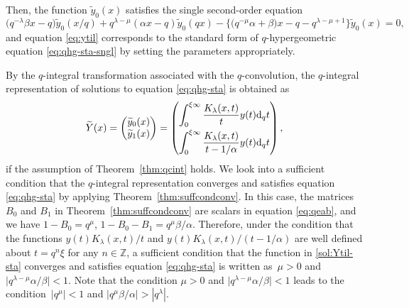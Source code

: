 \documentclass[pdftex]{sigma}
\numberwithin{equation}{section}
\theoremstyle{definition}
\begin{document}
Then, the function $\widetilde{y}_0(x)$ satisfies the single second-order equation
\begin{equation} \label{eq:ytil}
\bigl(q^{-\lambda}\beta x-q\bigr)\widetilde{y}_0(x/q) + q^{\lambda-\mu}(\alpha x-q )\widetilde{y}_0(qx) -\bigl\{ \bigl(q^{-\mu}\alpha+\beta\bigr)x- q - q^{\lambda-\mu+1}\bigr\} \widetilde{y}_0(x)=0,
\end{equation}
and equation \eqref{eq:ytil} corresponds to the standard form of $q$-hypergeometric equation \eqref{eq:qhg-sta-sngl} by setting the parameters appropriately.

By the $q$-integral transformation associated with the $q$-convolution, the $q$-integral representation of solutions to equation \eqref{eq:qhg-sta} is obtained as
\begin{equation} \label{sol:Ytil-sta}
\widetilde{Y}(x)
= \begin{pmatrix}
 \widetilde{y}_0(x) \\
 \widetilde{y}_1(x)
 \end{pmatrix}
=
\begin{pmatrix}
 \displaystyle \int_0^{\xi \infty} \frac{K_{\lambda}(x,t)}{t} y(t) {\rm d}_q t \vspace{1mm}\\
 \displaystyle \int_0^{\xi \infty} \frac{K_{\lambda}(x,t)}{t - 1/\alpha} y(t) {\rm d}_q t
\end{pmatrix} ,
\end{equation}
if the assumption of Theorem~\ref{thm:qcint} holds.
We look into a sufficient condition that the $q$-integral representation converges and satisfies equation \eqref{eq:qhg-sta} by applying Theorem~\ref{thm:suffcondconv}.
In this case, the matrices $B_0$ and $B_1$ in Theorem~\ref{thm:suffcondconv} are scalars in equation \eqref{eq:qeab}, and we have ${1 - B_0 = q^{\mu}}$, ${1 - B_0 - B_1 = q^{\mu} \beta /\alpha}$.
Therefore, under the condition that the functions $y(t) K_{\lambda}(x,t)/ t $ and ${ y(t) K_{\lambda}(x,t)/(t-1/\alpha ) }$ are well defined about $t = q^n \xi $ for any $n \in \mathbb{Z} $, a sufficient condition that the function in \eqref{sol:Ytil-sta} converges and satisfies equation \eqref{eq:qhg-sta} is written as~$ \mu >0$ and ${ \big|q^{\lambda - \mu} \alpha /\beta \big|<1} $.
Note that the condition $ \mu >0$ and $ \big|q^{\lambda - \mu} \alpha /\beta \big|<1 $ leads to the condition~${|q^{\mu } |<1}$ and $ {|q^{ \mu} \beta / \alpha | > |q^{\lambda } |}$.
\end{document}
